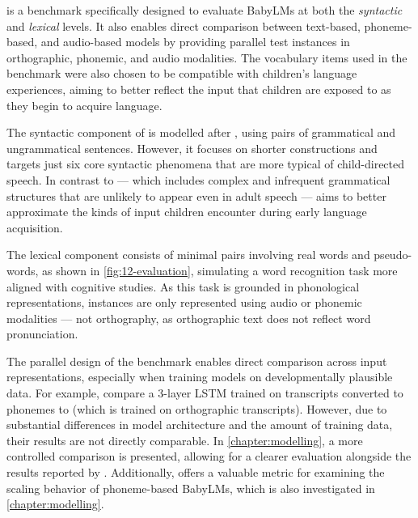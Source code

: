 

\babyslm \citep{lavechin} is a benchmark specifically designed to evaluate BabyLMs at both the \emph{syntactic} and \emph{lexical} levels. It also enables direct comparison between text-based, phoneme-based, and audio-based models by providing parallel test instances in orthographic, phonemic, and audio modalities. The vocabulary items used in the benchmark were also chosen to be compatible with children's language experiences, aiming to better reflect the input that children are exposed to as they begin to acquire language. 

The syntactic component of \babyslm is modelled after \blimp, using pairs of grammatical and ungrammatical sentences. However, it focuses on shorter constructions and targets just six core syntactic phenomena that are more typical of child-directed speech. In contrast to \blimp --- which includes complex and infrequent grammatical structures that are unlikely to appear even in adult speech --- \babyslm aims to better approximate the kinds of input children encounter during early language acquisition. 

The lexical component consists of minimal pairs involving real words and pseudo-words, as shown in \cref{fig:12-evaluation}, simulating a word recognition task more aligned with cognitive studies. As this task is grounded in phonological representations, instances are only represented using audio or phonemic modalities --- not orthography, as orthographic text does not reflect word pronunciation. 

The parallel design of the \babyslm benchmark enables direct comparison across input representations, especially when training models on developmentally plausible data. For example, \citet{lavechin} compare a 3-layer LSTM trained on \childes transcripts converted to phonemes to \babyberta (which is trained on orthographic \childes transcripts). However, due to substantial differences in model architecture and the amount of training data, their results are not directly comparable. In \cref{chapter:modelling}, a more controlled comparison is presented, allowing for a clearer evaluation alongside the results reported by \citet{lavechin}. Additionally, \babyslm offers a valuable metric for examining the scaling behavior of phoneme-based BabyLMs, which is also investigated in \cref{chapter:modelling}. 

